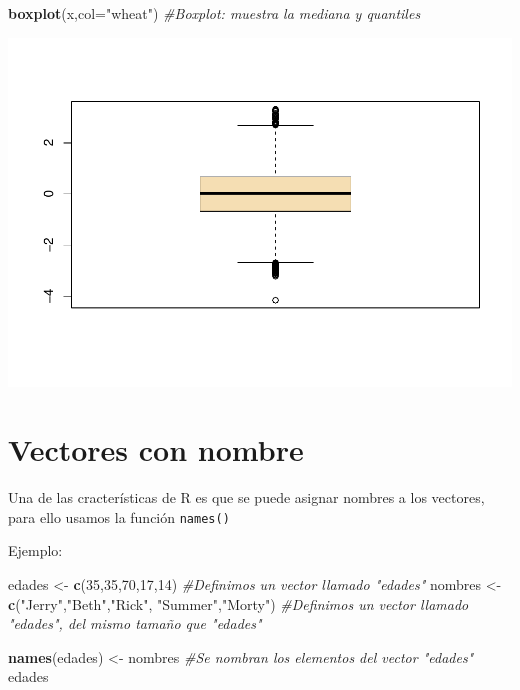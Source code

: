 \documentclass[
]{book}
\newenvironment{Shaded}{\begin{snugshade}}{\end{snugshade}}
\newcommand{\AttributeTok}[1]{\textcolor[rgb]{0.13,0.29,0.53}{#1}}
\newcommand{\CommentTok}[1]{\textcolor[rgb]{0.56,0.35,0.01}{\textit{#1}}}
\newcommand{\DecValTok}[1]{\textcolor[rgb]{0.00,0.00,0.81}{#1}}
\newcommand{\FunctionTok}[1]{\textcolor[rgb]{0.13,0.29,0.53}{\textbf{#1}}}
\newcommand{\NormalTok}[1]{#1}
\newcommand{\OtherTok}[1]{\textcolor[rgb]{0.56,0.35,0.01}{#1}}
\newcommand{\StringTok}[1]{\textcolor[rgb]{0.31,0.60,0.02}{#1}}
\begin{document}
\begin{Shaded}
\begin{Highlighting}[]
\FunctionTok{boxplot}\NormalTok{(x,}\AttributeTok{col=}\StringTok{"wheat"}\NormalTok{) }\CommentTok{\#Boxplot: muestra la mediana y quantiles}
\end{Highlighting}
\end{Shaded}

\includegraphics{bookdown-demo_files/figure-latex/unnamed-chunk-76-3.pdf}

\section{Vectores con nombre}\label{vectores-con-nombre}

Una de las cracterísticas de R es que se puede asignar nombres a los vectores, para ello usamos la función \texttt{names()}

Ejemplo:

\begin{Shaded}
\begin{Highlighting}[]
\NormalTok{edades }\OtherTok{\textless{}{-}} \FunctionTok{c}\NormalTok{(}\DecValTok{35}\NormalTok{,}\DecValTok{35}\NormalTok{,}\DecValTok{70}\NormalTok{,}\DecValTok{17}\NormalTok{,}\DecValTok{14}\NormalTok{) }\CommentTok{\#Definimos un vector llamado "edades"}
\NormalTok{nombres }\OtherTok{\textless{}{-}} \FunctionTok{c}\NormalTok{(}\StringTok{"Jerry"}\NormalTok{,}\StringTok{"Beth"}\NormalTok{,}\StringTok{"Rick"}\NormalTok{, }\StringTok{"Summer"}\NormalTok{,}\StringTok{"Morty"}\NormalTok{) }\CommentTok{\#Definimos un vector llamado "edades", del mismo tamaño que "edades"}

\FunctionTok{names}\NormalTok{(edades) }\OtherTok{\textless{}{-}}\NormalTok{ nombres }\CommentTok{\#Se nombran los elementos del vector "edades"}
\NormalTok{edades}
\end{Highlighting}
\end{Shaded}
\end{document}
